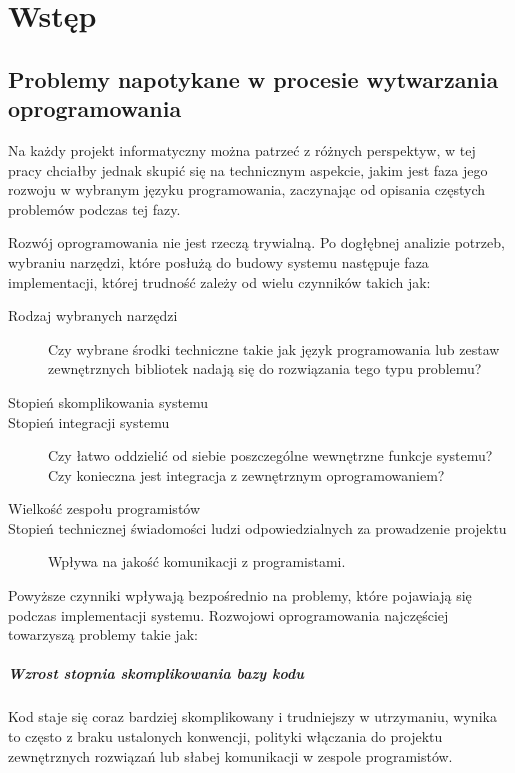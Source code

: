 
\nocite{ruby_way}

\chapter[Wstęp]{Wstęp}
	\section{Problemy napotykane w procesie wytwarzania oprogramowania}
	  Na każdy projekt informatyczny można patrzeć z różnych perspektyw, w tej pracy chciałby jednak skupić się na technicznym aspekcie, jakim jest faza jego rozwoju w wybranym języku programowania, zaczynając od opisania częstych problemów podczas tej fazy.
	  
	  Rozwój oprogramowania nie jest rzeczą trywialną. Po dogłębnej analizie potrzeb, wybraniu narzędzi, które posłużą do budowy systemu następuje faza implementacji, której trudność zależy od wielu czynników takich jak:
	  
	  \begin{description}
	    \item[Rodzaj wybranych narzędzi] Czy wybrane środki techniczne takie jak język programowania lub zestaw zewnętrznych bibliotek nadają się do rozwiązania tego typu problemu?
	    \item[Stopień skomplikowania systemu]
	    \item[Stopień integracji systemu] Czy łatwo oddzielić od siebie poszczególne wewnętrzne funkcje systemu? Czy konieczna jest integracja z zewnętrznym oprogramowaniem?
	    \item[Wielkość zespołu programistów]
	    \item[Stopień technicznej świadomości ludzi odpowiedzialnych za prowadzenie projektu] Wpływa na jakość komunikacji z programistami.
	  \end{description}
	  
	  Powyższe czynniki wpływają bezpośrednio na problemy, które pojawiają się podczas implementacji systemu. Rozwojowi oprogramowania najczęściej towarzyszą problemy takie jak:
	  
	  \paragraph{Wzrost stopnia skomplikowania bazy kodu}
	    Kod staje się coraz bardziej skomplikowany i trudniejszy w utrzymaniu, wynika to często z braku ustalonych konwencji, polityki włączania do projektu zewnętrznych rozwiązań lub słabej komunikacji w zespole programistów.
